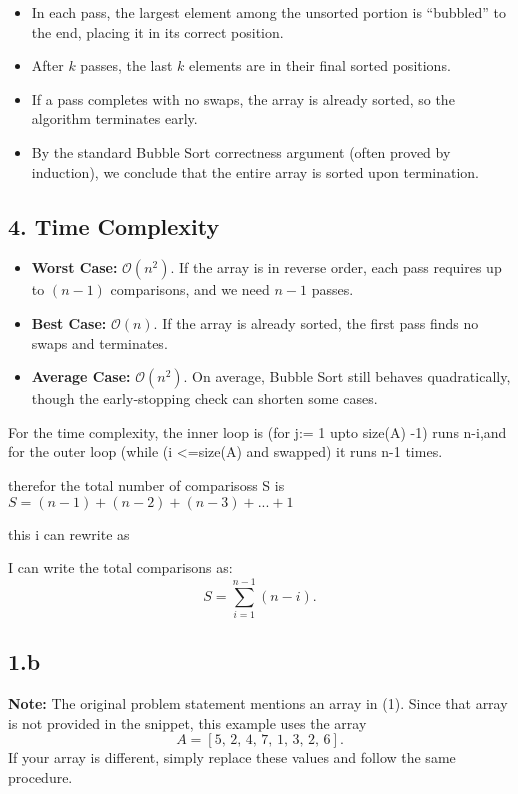 \documentclass{article}
\theoremstyle{remark}
\begin{document}
\begin{itemize}
  \item In each pass, the largest element among the unsorted portion is ``bubbled'' to the end, placing it in its correct position.
  \item After \(k\) passes, the last \(k\) elements are in their final sorted positions.
  \item If a pass completes with no swaps, the array is already sorted, so the algorithm terminates early.
  \item By the standard Bubble Sort correctness argument (often proved by induction), we conclude that the entire array is sorted upon termination.
\end{itemize}

\subsection*{4. Time Complexity}
\begin{itemize}
  \item \textbf{Worst Case:} \(\mathcal{O}(n^2)\). If the array is in reverse order, each pass requires up to \((n-1)\) comparisons, and we need \(n-1\) passes.
  \item \textbf{Best Case:} \(\mathcal{O}(n)\). If the array is already sorted, the first pass finds no swaps and terminates.
  \item \textbf{Average Case:} \(\mathcal{O}(n^2)\). On average, Bubble Sort still behaves quadratically, though the early‐stopping check can shorten some cases.
\end{itemize}


For the time complexity, the inner loop is (for j:= 1 upto size(A) -1) runs n-i,and for the outer loop (while (i <=size(A) and swapped) it runs n-1 times. 

therefor the total number of comparisoss S is 
$S = (n-1) + (n-2) + (n-3) +... + 1$

this i can rewrite as 

I can write the total comparisons as:
\[
S = \sum_{i=1}^{n-1} (n - i).
\]

\subsection{1.b}



\textbf{Note:} The original problem statement mentions an array in (1). 
Since that array is not provided in the snippet, 
this example uses the array 
\[
A = [5,\, 2,\, 4,\, 7,\, 1,\, 3,\, 2,\, 6].
\]
If your array is different, simply replace these values and follow the same procedure.
\end{document}
